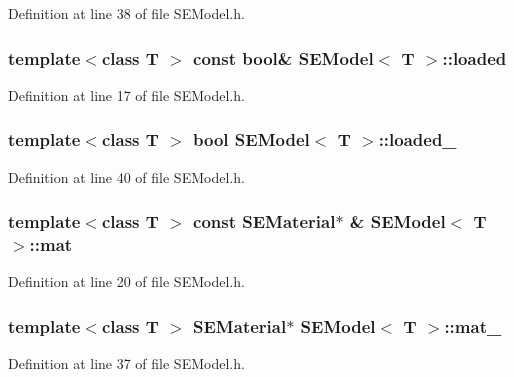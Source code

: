 Definition at line 38 of file S\+E\+Model.\+h.

\subsubsection[{loaded}]{\setlength{\rightskip}{0pt plus 5cm}template$<$class T $>$ const bool\& {\bf S\+E\+Model}$<$ T $>$\+::loaded}\label{class_s_e_model_a5f7789eff450237e1dc2a282a4a9f459}


Definition at line 17 of file S\+E\+Model.\+h.

\subsubsection[{loaded\+\_\+}]{\setlength{\rightskip}{0pt plus 5cm}template$<$class T $>$ bool {\bf S\+E\+Model}$<$ T $>$\+::loaded\+\_\+\hspace{0.3cm}{\ttfamily [protected]}}\label{class_s_e_model_acb2ad45676edb59fa4b5d8b48208ccc0}


Definition at line 40 of file S\+E\+Model.\+h.

\subsubsection[{mat}]{\setlength{\rightskip}{0pt plus 5cm}template$<$class T $>$ const S\+E\+Material$\ast$ \& {\bf S\+E\+Model}$<$ T $>$\+::mat}\label{class_s_e_model_a8e28cb3ece5c3488390d490b9244caca}


Definition at line 20 of file S\+E\+Model.\+h.

\subsubsection[{mat\+\_\+}]{\setlength{\rightskip}{0pt plus 5cm}template$<$class T $>$ S\+E\+Material$\ast$ {\bf S\+E\+Model}$<$ T $>$\+::mat\+\_\+\hspace{0.3cm}{\ttfamily [protected]}}\label{class_s_e_model_a04f2febf12201e2e1e1a940c3d1ce851}


Definition at line 37 of file S\+E\+Model.\+h.

